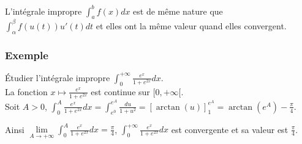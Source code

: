 \documentclass[a4paper,10pt]{book} %
\newcommand{\displayAmath}{\displaystyle}
\begin{document}
L'intégrale impropre $\displayAmath\int_a^bf(x)dx$ est de même nature que $\displayAmath\int_{\alpha}^{\beta}f(u(t))u'(t)dt$ et elles ont la même valeur quand elles convergent.

\subsubsection{Exemple}
Étudier l'intégrale impropre $\displayAmath\int_0^{+\infty}\frac{e^x}{1+e^{2x}}dx$.\\
La fonction $x\mapsto \frac{e^x}{1+e^{2x}}$ est continue sur $[0,+\infty[$.\\
Soit $A>0$, $\displayAmath\int_{0}^{A}\frac{e^x}{1+e^{2x}}dx= \int_{e^0}^{e^A}\frac{du}{1+u^2}=[\arctan(u)]_1^{e^A}=\arctan(e^A)-\frac{\pi}{4}$.

Ainsi $\displayAmath\lim\limits_{A\rightarrow+\infty}\int_0^A\frac{e^x}{1+e^{2x}}dx=\frac{\pi}{4}$, $\displayAmath\int_0^{+\infty}\frac{e^x}{1+e^{2x}}dx$ est convergente et sa valeur est $\frac{\pi}{4}$.

\newpage
\end{document}
